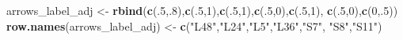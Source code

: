 \documentclass[12pt,]{book}
\newenvironment{Shaded}{\begin{snugshade}}{\end{snugshade}}
\newcommand{\DecValTok}[1]{\textcolor[rgb]{0.00,0.00,0.81}{#1}}
\newcommand{\KeywordTok}[1]{\textcolor[rgb]{0.13,0.29,0.53}{\textbf{#1}}}
\newcommand{\NormalTok}[1]{#1}
\newcommand{\StringTok}[1]{\textcolor[rgb]{0.31,0.60,0.02}{#1}}
\begin{document}
\begin{Shaded}
\begin{Highlighting}[]
\NormalTok{arrows_label_adj <-}\StringTok{ }\KeywordTok{rbind}\NormalTok{(}\KeywordTok{c}\NormalTok{(.}\DecValTok{5}\NormalTok{,.}\DecValTok{8}\NormalTok{),}\KeywordTok{c}\NormalTok{(.}\DecValTok{5}\NormalTok{,}\DecValTok{1}\NormalTok{),}\KeywordTok{c}\NormalTok{(.}\DecValTok{5}\NormalTok{,}\DecValTok{1}\NormalTok{),}\KeywordTok{c}\NormalTok{(.}\DecValTok{5}\NormalTok{,}\DecValTok{0}\NormalTok{),}\KeywordTok{c}\NormalTok{(.}\DecValTok{5}\NormalTok{,}\DecValTok{1}\NormalTok{),}
                          \KeywordTok{c}\NormalTok{(.}\DecValTok{5}\NormalTok{,}\DecValTok{0}\NormalTok{),}\KeywordTok{c}\NormalTok{(}\DecValTok{0}\NormalTok{,.}\DecValTok{5}\NormalTok{))}
\KeywordTok{row.names}\NormalTok{(arrows_label_adj) <-}\StringTok{ }\KeywordTok{c}\NormalTok{(}\StringTok{"L48"}\NormalTok{,}\StringTok{"L24"}\NormalTok{,}\StringTok{"L5"}\NormalTok{,}\StringTok{"L36"}\NormalTok{,}\StringTok{"S7"}\NormalTok{,}
                                 \StringTok{"S8"}\NormalTok{,}\StringTok{"S11"}\NormalTok{)}


\end{Highlighting}
\end{Shaded}
\end{document}

